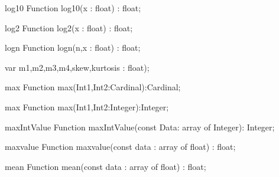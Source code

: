 \FPCexample{}


\begin{function}{log10}
\Declaration
Function log10(x : float) : float;
\Description

\Errors
\SeeAlso
\end{function}

\FPCexample{}


\begin{function}{log2}
\Declaration
Function log2(x : float) : float;
\Description

\Errors
\SeeAlso
\end{function}

\FPCexample{}


\begin{function}{logn}
\Declaration
Function logn(n,x : float) : float;
\Description

\Errors
\SeeAlso
\end{function}

\FPCexample{}


  var m1,m2,m3,m4,skew,kurtosis : float);
\begin{function}{max}
\Declaration
Function max(Int1,Int2:Cardinal):Cardinal;
\Description

\Errors
\SeeAlso
\end{function}

\FPCexample{}


\begin{function}{max}
\Declaration
Function max(Int1,Int2:Integer):Integer;
\Description

\Errors
\SeeAlso
\end{function}

\FPCexample{}


\begin{function}{maxIntValue}
\Declaration
Function maxIntValue(const Data: array of Integer): Integer;
\Description

\Errors
\SeeAlso
\end{function}

\FPCexample{}


\begin{function}{maxvalue}
\Declaration
Function maxvalue(const data : array of float) : float;
\Description

\Errors
\SeeAlso
\end{function}

\FPCexample{}


\begin{function}{mean}
\Declaration
Function mean(const data : array of float) : float;
\Description

\Errors
\SeeAlso
\end{function}

